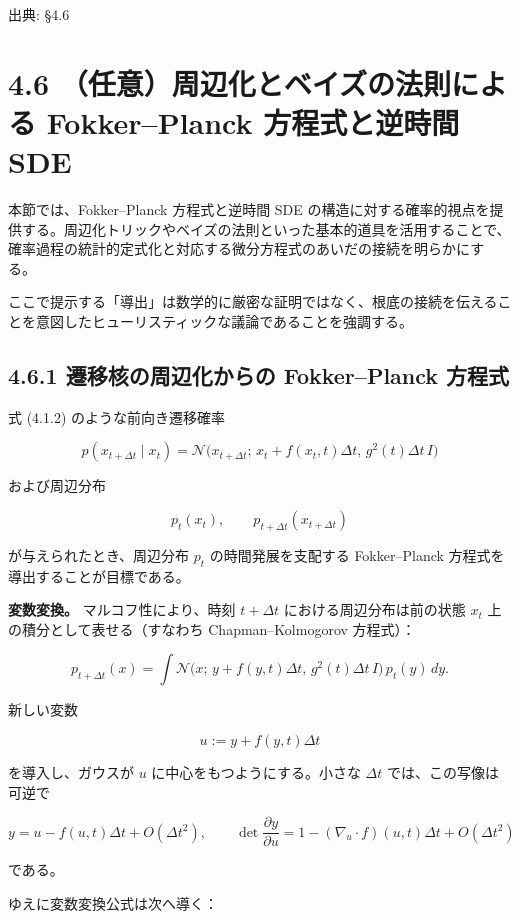 

{\color{gray}\footnotesize 出典: §4.6\par}
\vspace{0.2em}

\section*{4.6 （任意）周辺化とベイズの法則による Fokker–Planck 方程式と逆時間 SDE}


本節では、Fokker–Planck 方程式と逆時間 SDE の構造に対する確率的視点を提供する。周辺化トリックやベイズの法則といった基本的道具を活用することで、確率過程の統計的定式化と対応する微分方程式のあいだの接続を明らかにする。

ここで提示する「導出」は数学的に厳密な証明ではなく、根底の接続を伝えることを意図したヒューリスティックな議論であることを強調する。

\subsection*{4.6.1 遷移核の周辺化からの Fokker–Planck 方程式}


式 (4.1.2) のような前向き遷移確率

\[
p(x_{t+\Delta t}\mid x_t)=\mathcal{N}\bigl(x_{t+\Delta t};\, x_t+f(x_t,t)\Delta t,\, g^2(t)\Delta t\, I\bigr)
\]


および周辺分布

\[
p_t(x_t),\qquad p_{t+\Delta t}(x_{t+\Delta t})
\]


が与えられたとき、周辺分布 $p_t$ の時間発展を支配する Fokker–Planck 方程式を導出することが目標である。

\textbf{変数変換。} マルコフ性により、時刻 $t+\Delta t$ における周辺分布は前の状態 $x_t$ 上の積分として表せる（すなわち Chapman–Kolmogorov 方程式）：

\[
p_{t+\Delta t}(x)
=\int\mathcal{N}\bigl(x;\, y+f(y,t)\Delta t,\, g^2(t)\Delta t\, I\bigr)\, p_t(y)\, dy.
\]


新しい変数

\[
u:=y+f(y,t)\Delta t
\]


を導入し、ガウスが $u$ に中心をもつようにする。小さな $\Delta t$ では、この写像は可逆で

\[
y=u-f(u,t)\Delta t+O(\Delta t^2), \qquad
\det\frac{\partial y}{\partial u}=1-(\nabla_u\cdot f)(u,t)\Delta t+O(\Delta t^2)
\]


である。

ゆえに変数変換公式は次へ導く：

